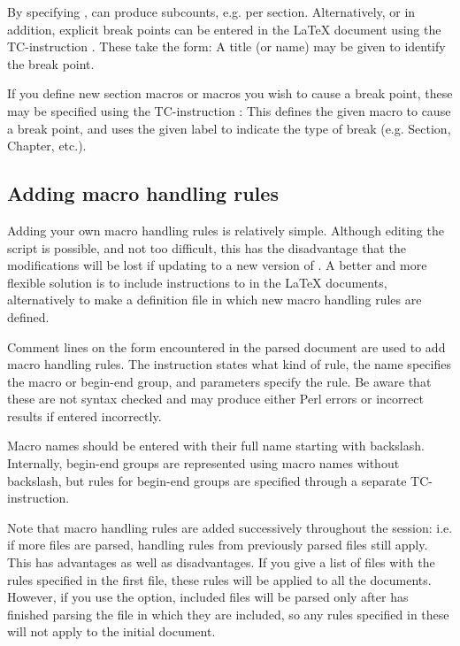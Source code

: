 \documentclass{article}
\begin{document}
By specifying , \TeXcount{} can produce subcounts, e.g. per section. Alternatively, or in addition, explicit break points can be entered in the \LaTeX{} document using the TC-instruction . These take the form:
A title (or name) may be given to identify the break point.

If you define new section macros or macros you wish to cause a break point, these may be specified using the TC-instruction :
This defines the given macro to cause a break point, and uses the given label to indicate the type of break (e.g. Section, Chapter, etc.).

\subsection{Adding macro handling rules}\label{sec:TC_addrule}

Adding your own macro handling rules is relatively simple. Although editing the script is possible, and not too difficult, this has the disadvantage that the modifications will be lost if updating to a new version of \TeXcount. A better and more flexible solution is to include instructions to \TeXcount{} in the \LaTeX{} documents, alternatively to make a definition file in which new macro handling rules are defined.

Comment lines on the form
encountered in the parsed document are used to add macro handling rules. The instruction states what kind of rule, the name specifies the macro or begin-end group, and parameters specify the rule. Be aware that these are not syntax checked and may produce either Perl errors or incorrect results if entered incorrectly.

Macro names should be entered with their full name starting with backslash. Internally, begin-end groups are represented using macro names  without backslash, but rules for begin-end groups are specified through a separate TC-instruction.

Note that macro handling rules are added successively throughout the session: i.e. if more files are parsed, handling rules from previously parsed files still apply. This has advantages as well as disadvantages. If you give a list of files with the rules specified in the first file, these rules will be applied to all the documents. However, if you use the  option, included files will be parsed only after \TeXcount{} has finished parsing the file in which they are included, so any rules specified in these will not apply to the initial document.
\end{document}
